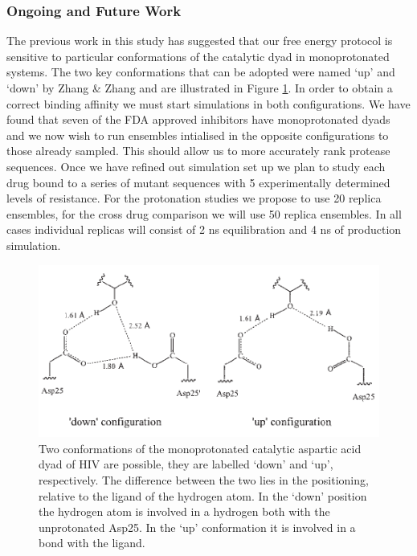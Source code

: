 \documentclass[a4paper,11pt]{article}
\begin{document}
\subsubsection{Ongoing and Future Work}\label{se:hiv_future}

The previous work in this study has suggested that our free energy protocol is sensitive to particular 
conformations of the catalytic dyad in monoprotonated systems. The two key conformations that can be 
adopted were named `up' and `down' by Zhang \& Zhang \cite{Zhang} and are illustrated in 
Figure \ref{fig:asp_conf}. In order to obtain a correct binding affinity we must start simulations in 
both configurations. We have found that seven of the FDA approved inhibitors have monoprotonated 
dyads and we now wish to run ensembles intialised in the opposite configurations to those already sampled.
This should allow us to more accurately rank protease sequences. Once we have refined out simulation set up
we plan to study each drug bound to a series of mutant sequences with 5 experimentally determined levels 
of resistance. For the protonation studies we propose to use 20 replica ensembles, for the cross drug comparison
we will use 50 replica ensembles. In all cases individual replicas will consist of 2 ns equilibration and 4 
ns of production simulation.

\begin{figure}
  \begin{center}
    \includegraphics[]{asp_conf}
    \caption{Two conformations of the monoprotonated catalytic aspartic acid dyad of HIV are possible, they are labelled `down' and `up', respectively. The difference between the two lies in the positioning, relative to the ligand of the hydrogen atom. In the `down' position the hydrogen atom is involved in a hydrogen both with the unprotonated Asp25. In the `up' conformation it is involved in a bond with the ligand.}
    \label{fig:asp_conf} 
  \end{center}
\end{figure}
\end{document}
